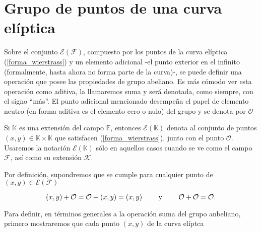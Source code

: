 \documentclass[12pt,oneside]{book}
\begin{document}
\section{Grupo de puntos de una curva el\'iptica}

Sobre el conjunto $\mathcal{E(F)}$, compuesto por los puntos de la curva el\'iptica (\ref{forma_wierstrass}) y un elemento adicional -el punto exterior en el infinito (formalmente, hasta ahora no forma parte de la curva)-, se puede definir una operaci\'on que posee las propiedades de grupo abeliano. Es m\'as c\'omodo ver esta operaci\'on como aditiva, la llamaremos suma y ser\'a denotada, como siempre, con el signo ``m\'as''. El punto adicional mencionado desempe\~na el papel de elemento neutro (en forma aditiva es el elemento cero o nulo) del grupo y se denota por $\mathcal{O}$

Si $\mathbb{K}$ es una extensi\'on del campo $\mathbb{F}$, entonces $\mathcal{E}(\mathbb{K})$ denota al conjunto de puntos $(x,y)\in \mathbb{K}\times\mathbb{K}$ que satisfacen (\ref{forma_wierstrass}), junto con el punto $\mathcal{O}$. Usaremos la notaci\'on $\mathcal{E}(\mathbb{K})$ s\'olo en aquellos casos cuando se ve como el campo $\mathcal{F}$, as\'i como su extensi\'on $\mathcal{K}$.

Por definici\'on, supondremos que se cumple para cualquier punto de $(x,y)\in\mathcal{E(F)}$

$$(x,y) + \mathcal{O} = \mathcal{O} + (x,y) = (x,y)\qquad \hbox{ y } \qquad \mathcal{O} + \mathcal{O} = \mathcal{O}.$$


Para definir, en t\'erminos generales a la operaci\'on suma del grupo anbeliano, primero mostraremos que cada punto $(x,y)$ de la curva el\'iptca
\end{document}
